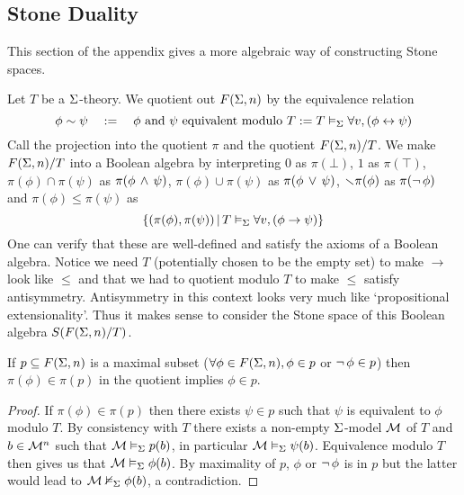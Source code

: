 \subsection{Stone Duality}
This section of the appendix gives a more algebraic way of 
constructing Stone spaces.

\begin{dfn}
    Let $T$ be a $\Sigma$-theory.
    We quotient out $F(\Sigma,n)$ by the equivalence relation
    \[  
        \phi \sim \psi \quad := 
        \quad \phi \text{ and } \psi \text{ equivalent modulo } T
        := T \vDash_{\Sigma} \forall v, (\phi \leftrightarrow \psi)
    \]
    Call the projection into the quotient $\pi$
    and the quotient $F(\Sigma,n) / T$.
    We make $F(\Sigma,n) / T$ into a Boolean algebra by 
    interpreting $0$ as $\pi(\bot)$, $1$ as $\pi(\top)$, 
    $\pi(\phi) \cap \pi(\psi)$ as $\pi(\phi \, \land \, \psi)$,
    $\pi(\phi) \cup \pi(\psi)$ as $\pi(\phi \, \lor \, \psi)$,
    $\smallsetminus \pi(\phi)$ as $\pi(\neg\, \phi)$ and 
    $\pi(\phi) \leq \pi(\psi)$ as 
    \[\left\{(\pi(\phi),\pi(\psi)) \,|\, T \vDash_{\Sigma} \forall v, (\phi \to \psi)\right\}\]
    One can verify that these are well-defined and satisfy the axioms of 
    a Boolean algebra.
    Notice we need $T$ (potentially chosen to be the empty set) 
    to make $\to$ look like $\leq$ and that we had to quotient modulo $T$ 
    to make $\leq$ satisfy antisymmetry. 
    Antisymmetry in this context looks very much like 
    `propositional extensionality'.
    Thus it makes sense to consider the Stone space of this Boolean algebra 
    $S(F(\Sigma,n) / T)$.
\end{dfn}

\begin{lem}
    If $p \subseteq F(\Sigma,n)$ is a maximal subset 
    ($\forall \phi \in F(\Sigma,n), \phi \in p$ or $\neg\, \phi \in p$) then 
    $\pi(\phi) \in \pi(p)$ in the quotient implies $\phi \in p$.
\end{lem}
\begin{proof}
    If $\pi(\phi) \in \pi(p)$ then there exists $\psi \in p$ such that 
    $\psi$ is equivalent to $\phi$ modulo $T$.
    By consistency with $T$ there exists a non-empty $\Sigma$-model $\mathcal{M}$ of $T$
    and $b \in {\mathcal{M}}^n$ 
    such that $\mathcal{M} \vDash_{\Sigma} p(b)$, 
    in particular $\mathcal{M} \vDash_{\Sigma} \psi(b)$.
    Equivalence modulo $T$ then gives us that $\mathcal{M} \vDash_{\Sigma} \phi(b)$.
    By maximality of $p$, 
    $\phi$ or $\neg\, \phi$ is in $p$ but the latter would lead to 
    $\mathcal{M} \nvDash_{\Sigma} \phi(b)$, 
    a contradiction.
\end{proof}

